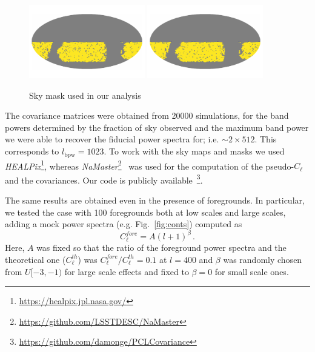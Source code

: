 \documentclass[a4paper,11pt]{article}
\newcommand{\clth}{C_\ell^{th}}
\newcommand{\clf}{C_\ell^{fore}}
\newcommand{\cl}{C_\ell}
\begin{document}
\begin{figure}
  \centering
  \includegraphics[width=0.45\textwidth]{./figures/mask-lss1.pdf}
  \includegraphics[width=0.45\textwidth]{./figures/mask-lss2.pdf}
  \caption{Sky mask used in our analysis}
  \label{fig:mask}
\end{figure}

The covariance matrices were obtained from 20000 simulations, for the band
powers determined by the fraction of sky observed and the maximum band power
we were able to recover the fiducial power spectra for; i.e. $\sim 2 \times
512$. This corresponds to $l_{\mbox{bpw}} = 1023$. To work with the sky
maps and masks we used
\textit{HEALPix}\footnote{\url{https://healpix.jpl.nasa.gov/}}, whereas 
\textit{NaMaster}\footnote{\url{https://github.com/LSSTDESC/NaMaster}}~\cite{2018arXiv180909603A}
was used for the computation of the pseudo-$\cl$ and the covariances. Our code
is publicly
available~\footnote{\url{https://github.com/damonge/PCLCovariance}}.

The same results are obtained even in the presence of foregrounds. In
particular, we tested the case with 100 foregrounds both at low scales and
large scales, adding a mock power spectra (e.g. Fig.~\ref{fig:conts}) computed as 
\begin{equation}
  \clf = A (l + 1)^{\beta}\,.
  \label{eq:conts}
\end{equation}
Here, $A$ was fixed so that the ratio of the foreground power spectra and the
theoretical one ($\clth$) was $\clf/\clth = 0.1$ at $l=400$ and $\beta$ was
randomly chosen from $U[-3, -1)$ for large scale effects and fixed to $\beta =
0$ for small scale ones. 
\end{document}

